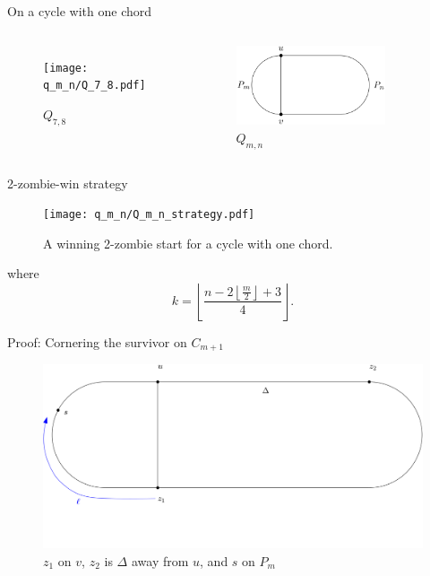 \begin{frame}{On a cycle with one chord}
\begin{columns}[onlytextwidth,T]
\begin{figure}
\texttt{[image: q\_m\_n/Q\_7\_8.pdf]}
\caption{$Q_{7,8}$}
\end{figure}
\begin{figure}
\includegraphics[width=0.8\textwidth]{q_m_n/Q_m_n_basic.png}
\caption{$Q_{m,n}$}
\end{figure}
\end{columns}
\end{frame}

\begin{frame}{2-zombie-win strategy}
\begin{figure}
\texttt{[image: q\_m\_n/Q\_m\_n\_strategy.pdf]}
\caption{A winning 2-zombie start for a cycle with one chord.}
\end{figure}
where
\[ k = \left\lfloor \frac{n - 2 \left\lfloor\frac{m}{2}\right\rfloor +3}{4} \right\rfloor. \]
\end{frame}

\begin{frame}{Proof: Cornering the survivor on $C_{m+1}$}
\begin{figure}
\centering
\includegraphics{q_m_n/diagram1}
\caption{$z_1$ on $v$, $z_2$ is $\Delta$ away from $u$, and $s$ on $P_m$ \label{fig:onthechord}}
\end{figure}
\end{frame}

